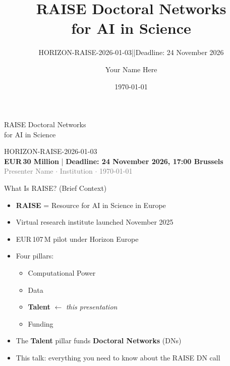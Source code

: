 \documentclass[aspectratio=169]{beamer}
\title{RAISE Doctoral Networks\\for AI in Science}
\subtitle{HORIZON-RAISE-2026-01-03\quad|\quad\eur{30 Million}\quad|\quad Deadline: 24 November 2026}
\author{Your Name Here}
\date{\today}
\institute{}
\newcommand{\eur}[1]{EUR\,#1}
\newcommand{\highlight}[1]{\textcolor{euBlue}{\textbf{#1}}}
\newcommand{\goldhl}[1]{\colorbox{euGold}{\textcolor{euBlue}{\textbf{#1}}}}
\begin{document}
\begin{frame}[plain]
\vfill
\begin{center}
  {\LARGE RAISE Doctoral Networks\\[6pt]for AI in Science\par}
  \vspace{10pt}
  \vspace{10pt}

  {\large\textcolor{euBlue}{HORIZON-RAISE-2026-01-03}}\\[6pt]
  {\large \goldhl{\eur{30 Million}} \quad\textcolor{euBlue}{|}\quad
   \textbf{Deadline: 24 November 2026, 17:00 Brussels}}\\[14pt]
  {\normalsize\textcolor{gray}{Presenter Name $\cdot$ Institution $\cdot$ \today}}
\end{center}
\vfill
\end{frame}

\begin{frame}{What Is RAISE?  (Brief Context)}
\begin{itemize}
  \item \highlight{RAISE} = Resource for AI in Science in Europe
  \item Virtual research institute launched November 2025
  \item EUR\,107\,M pilot under Horizon Europe
  \item Four pillars:
    \begin{itemize}
      \item Computational Power
      \item Data
      \item \textbf{Talent} $\leftarrow$ \textit{this presentation}
      \item Funding
    \end{itemize}
  \item The \highlight{Talent} pillar funds \textbf{Doctoral Networks} (DNs)
  \item This talk: everything you need to know about the RAISE DN call
\end{itemize}
\end{frame}
\end{document}
